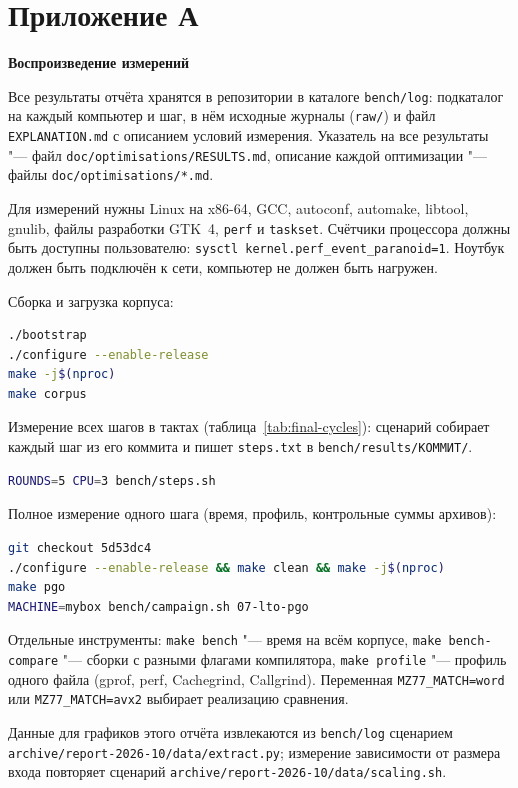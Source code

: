 \clearpage
{}
{}
\chapter*{Приложение А}
\vspace{-12pt}
{\centering\singlespacing\textbf{Воспроизведение измерений}\par}
\vspace{12pt}

Все результаты отчёта хранятся в репозитории в каталоге
\texttt{bench/log}: подкаталог на каждый компьютер и шаг, в нём исходные
журналы (\texttt{raw/}) и файл \texttt{EXPLANATION.md} с описанием условий
измерения. Указатель на все результаты "--- файл
\texttt{doc/optimisations/RESULTS.md}, описание каждой оптимизации "---
файлы \texttt{doc/optimisations/*.md}.

Для измерений нужны Linux на x86-64, GCC, autoconf, automake, libtool,
gnulib, файлы разработки GTK~4, \texttt{perf} и \texttt{taskset}. Счётчики
процессора должны быть доступны пользователю:
\texttt{sysctl kernel.perf\_event\_paranoid=1}. Ноутбук должен быть
подключён к сети, компьютер не должен быть нагружен.

Сборка и загрузка корпуса:
\begin{lstlisting}[language=bash,numbers=none]
./bootstrap
./configure --enable-release
make -j$(nproc)
make corpus
\end{lstlisting}

Измерение всех шагов в тактах (таблица~\ref{tab:final-cycles}): сценарий
собирает каждый шаг из его коммита и пишет \texttt{steps.txt} в
\texttt{bench/results/КОММИТ/}.
\begin{lstlisting}[language=bash,numbers=none]
ROUNDS=5 CPU=3 bench/steps.sh
\end{lstlisting}

Полное измерение одного шага (время, профиль, контрольные суммы архивов):
\begin{lstlisting}[language=bash,numbers=none]
git checkout 5d53dc4
./configure --enable-release && make clean && make -j$(nproc)
make pgo
MACHINE=mybox bench/campaign.sh 07-lto-pgo
\end{lstlisting}

Отдельные инструменты: \texttt{make bench} "--- время на всём корпусе,
\texttt{make bench-compare} "--- сборки с разными флагами компилятора,
\texttt{make profile} "--- профиль одного файла (gprof, perf, Cachegrind,
Callgrind). Переменная \texttt{MZ77\_MATCH=word} или
\texttt{MZ77\_MATCH=avx2} выбирает реализацию сравнения.

Данные для графиков этого отчёта извлекаются из \texttt{bench/log}
сценарием \texttt{archive/report-2026-10/data/extract.py}; измерение
зависимости от размера входа повторяет сценарий
\texttt{archive/report-2026-10/data/scaling.sh}.

